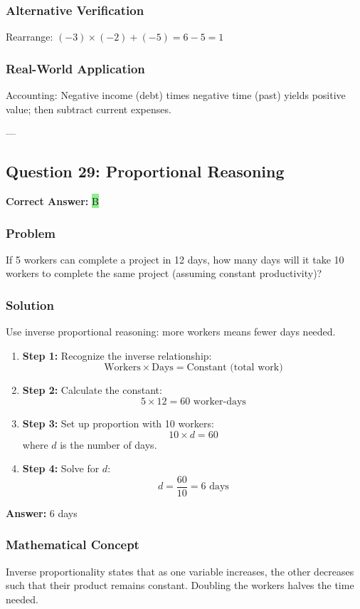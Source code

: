 \documentclass[12pt]{article}
\begin{document}
\subsubsection*{Alternative Verification}
Rearrange: $(-3) \times (-2) + (-5) = 6 - 5 = 1$ 

\subsubsection*{Real-World Application}
Accounting: Negative income (debt) times negative time (past) yields positive value; then subtract current expenses.

---

\subsection{Question 29: Proportional Reasoning}

\textbf{Correct Answer: } \colorbox{lightgreen}{B}

\subsubsection*{Problem}
If 5 workers can complete a project in 12 days, how many days will it take 10 workers to complete the same project (assuming constant productivity)?

\subsubsection*{Solution}

Use inverse proportional reasoning: more workers means fewer days needed.

\begin{enumerate}
\item \textbf{Step 1:} Recognize the inverse relationship:
  \[
  \text{Workers} \times \text{Days} = \text{Constant (total work)}
  \]
\item \textbf{Step 2:} Calculate the constant:
  \[
  5 \times 12 = 60 \text{ worker-days}
  \]
\item \textbf{Step 3:} Set up proportion with 10 workers:
  \[
  10 \times d = 60
  \]
  where $d$ is the number of days.
\item \textbf{Step 4:} Solve for $d$:
  \[
  d = \frac{60}{10} = 6 \text{ days}
  \]
\end{enumerate}

\textbf{Answer: } 6 days

\subsubsection*{Mathematical Concept}
Inverse proportionality states that as one variable increases, the other decreases such that their product remains constant. Doubling the workers halves the time needed.
\end{document}
